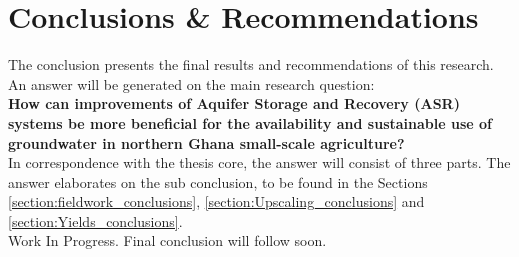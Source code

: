 \chapter{Conclusions \& Recommendations}
\label{chapter:conclusions}

The conclusion presents the final results and recommendations of this research. An answer will be generated on the main research question:  \\
 
\textbf{How can improvements of Aquifer Storage and Recovery (ASR) systems be more beneficial for the availability and sustainable use of groundwater in northern Ghana small-scale agriculture?} \\

In correspondence with the thesis core, the answer will consist of three parts. The answer elaborates on the sub conclusion, to be found in the Sections \ref{section:fieldwork_conclusions}, \ref{section:Upscaling_conclusions} and  \ref{section:Yields_conclusions}. \\

Work In Progress. Final conclusion will follow soon. \\


